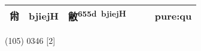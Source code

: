 \documentclass[14pt,a4paper]{scrartcl}
\begin{document}
\begin{longtable}[c]{@{}llllll@{}}
\begin{minipage}[t]{0.14\columnwidth}
㡀
\strut\end{minipage} &
\begin{minipage}[t]{0.14\columnwidth}\raggedright\strut
bjiejH
\strut\end{minipage} &
\begin{minipage}[t]{0.14\columnwidth}\raggedright\strut
敝\textsuperscript{655d~bjiejH}
\strut\end{minipage} &
\begin{minipage}[t]{0.14\columnwidth}\raggedright\strut
\strut\end{minipage} &
\begin{minipage}[t]{0.14\columnwidth}\raggedright\strut
\strut\end{minipage} &
\begin{minipage}[t]{0.14\columnwidth}\raggedright\strut
pure:qu
\strut\end{minipage}\tabularnewline
\bottomrule
\end{longtable}

(105) 0346 {[}2{]}
\end{document}

